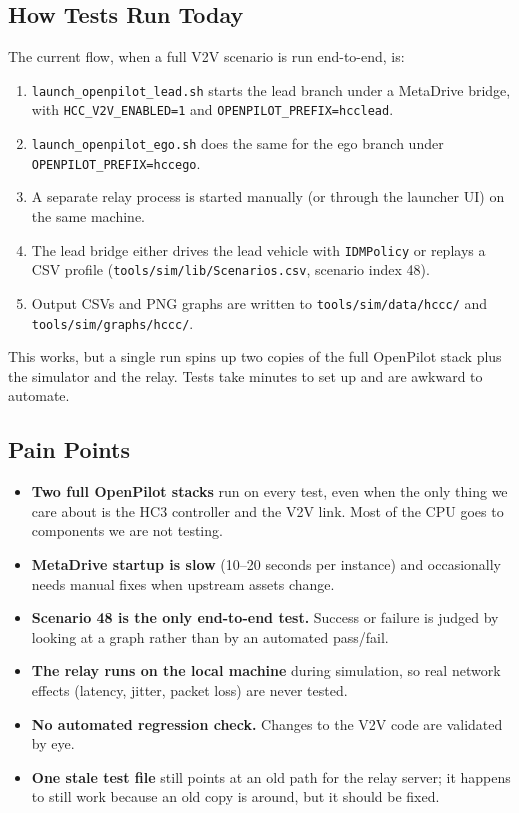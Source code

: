 \documentclass[12pt]{article}
\begin{document}
\subsection{How Tests Run Today}

The current flow, when a full V2V scenario is run end-to-end, is:

\begin{enumerate}
  \item \texttt{launch\_openpilot\_lead.sh} starts the lead branch under a MetaDrive bridge, with \texttt{HCC\_V2V\_ENABLED=1} and \texttt{OPENPILOT\_PREFIX=hcclead}.
  \item \texttt{launch\_openpilot\_ego.sh} does the same for the ego branch under \texttt{OPENPILOT\_PREFIX=hccego}.
  \item A separate relay process is started manually (or through the launcher UI) on the same machine.
  \item The lead bridge either drives the lead vehicle with \texttt{IDMPolicy} or replays a CSV profile (\texttt{tools/sim/lib/Scenarios.csv}, scenario index 48).
  \item Output CSVs and PNG graphs are written to \texttt{tools/sim/data/hccc/} and \texttt{tools/sim/graphs/hccc/}.
\end{enumerate}

This works, but a single run spins up two copies of the full OpenPilot stack plus the simulator and the relay. Tests take minutes to set up and are awkward to automate.

\subsection{Pain Points}

\begin{itemize}
  \item \textbf{Two full OpenPilot stacks} run on every test, even when the only thing we care about is the HC3 controller and the V2V link. Most of the CPU goes to components we are not testing.
  \item \textbf{MetaDrive startup is slow} (10--20 seconds per instance) and occasionally needs manual fixes when upstream assets change.
  \item \textbf{Scenario 48 is the only end-to-end test.} Success or failure is judged by looking at a graph rather than by an automated pass/fail.
  \item \textbf{The relay runs on the local machine} during simulation, so real network effects (latency, jitter, packet loss) are never tested.
  \item \textbf{No automated regression check.} Changes to the V2V code are validated by eye.
  \item \textbf{One stale test file} still points at an old path for the relay server; it happens to still work because an old copy is around, but it should be fixed.
\end{itemize}
\end{document}
